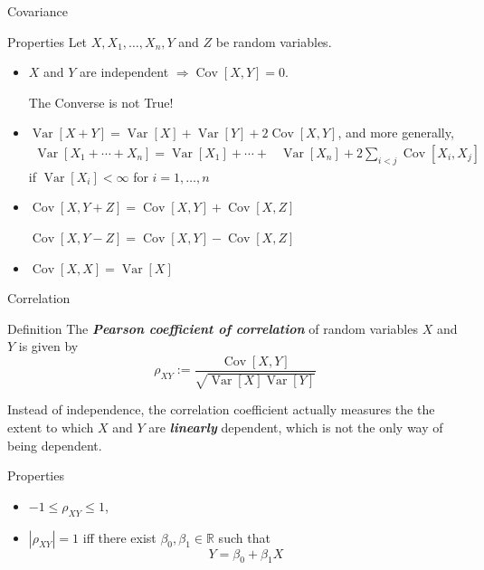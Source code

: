 \documentclass{beamer}
\newcommand{\bb}[1]{\textcolor{antiquefuchsia}{\textbf{\textit{#1}}}}
\begin{document}
\begin{frame}{Covariance}
\begin{block}{Properties}
Let $X, X_{1}, \ldots, X_{n}, Y$ and $Z$ be random variables.
\begin{itemize}
\item $X$ and $Y$ are independent $\Rightarrow \operatorname{Cov}[X, Y]=0$.

The Converse is not True!

\item $\operatorname{Var}[X+Y]=\operatorname{Var}[X]+\operatorname{Var}[Y]+2 \operatorname{Cov}[X, Y]$, and more generally,
$$
\begin{aligned}
\operatorname{Var}\left[X_{1}+\cdots+X_{n}\right]=\operatorname{Var}\left[X_{1}\right]+\cdots+& \operatorname{Var}\left[X_{n}\right]+2 \sum_{i<j} \operatorname{Cov}\left[X_{i}, X_{j}\right]
\end{aligned}
$$
if $\operatorname{Var}\left[X_{i}\right]<\infty$ for $i=1, \ldots, n$
\item $\operatorname{Cov}[X, Y+Z] = \operatorname{Cov}[X, Y] + \operatorname{Cov}[X, Z]$ 

$\operatorname{Cov}[X, Y-Z] = \operatorname{Cov}[X, Y] - \operatorname{Cov}[X, Z]$
\item $\operatorname{Cov}[X, X] = \operatorname{Var}[X]$
\end{itemize}
\end{block}
\end{frame}

\begin{frame}{Correlation}
\begin{block}{Definition}
The \bb{Pearson coefficient of correlation} of random variables $X$ and $Y$ is given by
$$
\rho_{X Y}:=\frac{\operatorname{Cov}[X, Y]}{\sqrt{\operatorname{Var}[X] \operatorname{Var}[Y]}}
$$
\end{block}
Instead of independence, the correlation coefficient actually measures the the extent to which $X$ and $Y$ are \bb{linearly} dependent, which is not the only way of being dependent.
\begin{block}{Properties}
\begin{itemize}
\item $-1 \leq \rho_{X Y} \leq 1$,
\item $\left|\rho_{X Y}\right|=1$ iff there exist $\beta_{0}, \beta_{1} \in \mathbb{R}$ such that
$$
Y=\beta_{0}+\beta_{1} X
$$
\end{itemize}
\end{block}
\end{frame}
\end{document}
